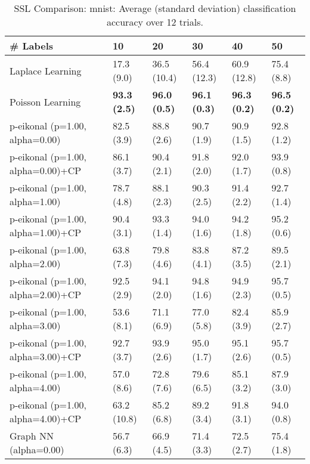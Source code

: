 \documentclass{article}
\begin{document}
\begin{table*}[t!]
\vspace{-3mm}
\caption{SSL Comparison: mnist: Average (standard deviation) classification accuracy over 12 trials.}
\vspace{-3mm}
\label{tab:SSL Comparison: mnist}
\vskip 0.15in
\begin{center}
\begin{small}
\begin{sc}
\begin{tabular}{llllll}
\toprule
\# Labels&\textbf{10}&\textbf{20}&\textbf{30}&\textbf{40}&\textbf{50}\\
\midrule
Laplace Learning&17.3 (9.0)      &36.5 (10.4)      &56.4 (12.3)      &60.9 (12.8)      &75.4 (8.8)      \\
Poisson Learning&{\bf 93.3 (2.5)}&{\bf 96.0 (0.5)}&{\bf 96.1 (0.3)}&{\bf 96.3 (0.2)}&{\bf 96.5 (0.2)}\\
p-eikonal (p=1.00, alpha=0.00)&82.5 (3.9)      &88.8 (2.6)      &90.7 (1.9)      &90.9 (1.5)      &92.8 (1.2)      \\
p-eikonal (p=1.00, alpha=0.00)+CP&86.1 (3.7)      &90.4 (2.1)      &91.8 (2.0)      &92.0 (1.7)      &93.9 (0.8)      \\
p-eikonal (p=1.00, alpha=1.00)&78.7 (4.8)      &88.1 (2.3)      &90.3 (2.5)      &91.4 (2.2)      &92.7 (1.4)      \\
p-eikonal (p=1.00, alpha=1.00)+CP&90.4 (3.1)      &93.3 (1.4)      &94.0 (1.6)      &94.2 (1.8)      &95.2 (0.6)      \\
p-eikonal (p=1.00, alpha=2.00)&63.8 (7.3)      &79.8 (4.6)      &83.8 (4.1)      &87.2 (3.5)      &89.5 (2.1)      \\
p-eikonal (p=1.00, alpha=2.00)+CP&92.5 (2.9)      &94.1 (2.0)      &94.8 (1.6)      &94.9 (2.3)      &95.7 (0.5)      \\
p-eikonal (p=1.00, alpha=3.00)&53.6 (8.1)      &71.1 (6.9)      &77.0 (5.8)      &82.4 (3.9)      &85.9 (2.7)      \\
p-eikonal (p=1.00, alpha=3.00)+CP&92.7 (3.7)      &93.9 (2.6)      &95.0 (1.7)      &95.1 (2.6)      &95.7 (0.5)      \\
p-eikonal (p=1.00, alpha=4.00)&57.0 (8.6)      &72.8 (7.6)      &79.6 (6.5)      &85.1 (3.2)      &87.9 (3.0)      \\
p-eikonal (p=1.00, alpha=4.00)+CP&63.2 (10.8)      &85.2 (6.8)      &89.2 (3.4)      &91.8 (3.1)      &94.0 (0.8)      \\
Graph NN (alpha=0.00)&56.7 (6.3)      &66.9 (4.5)      &71.4 (3.3)      &72.5 (2.7)      &75.4 (1.8)      \\

\end{tabular}
\end{sc}
\end{small}
\end{center}
\end{table*}
\end{document}
